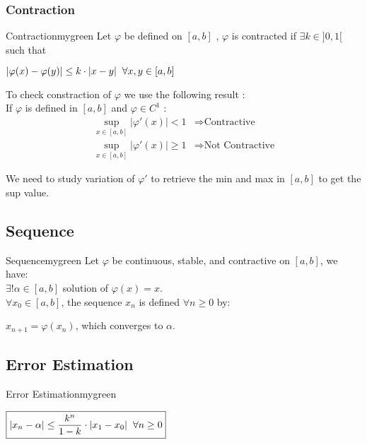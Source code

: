 \subsubsection{Contraction}
\begin{prettyBox}{Contraction}{mygreen}
Let \(\varphi\) be defined on \([a, b]\) , \(\varphi\) is contracted if 
\(\exists k \in ]0,1[\) such that

\begin{center}
 \(|\varphi(x) - \varphi(y)| \leq k\cdot|x-y| \hspace{0.2cm} \forall x,y 
\in[a,b]\)
\end{center}

\vspace{0.1cm}
To check constraction of \(\varphi\) we use the following result :\\[0.1cm]
If \(\varphi\) is defined in \([a,b]\) and \(\varphi \in C^{1} \) :
\begin{align*}
    \sup_{x \in [a, b]} |\varphi'(x)| < 1 &\Longrightarrow \text{Contractive}\\[0.1cm]
    \sup_{x \in [a, b]} |\varphi'(x)| \geq 1 &\Longrightarrow \text{Not Contractive}
\end{align*}
\vspace{0.1cm}

We need to study variation of \(\varphi'\) to retrieve
the min and max in \([a,b]\) to get the sup value.
\end{prettyBox}

\vspace{0.5cm}


\subsection{Sequence}
\begin{prettyBox}{Sequence}{mygreen}
    Let \(\varphi\) be continuous, stable, and contractive on \([a,b]\), we have:\\[0.15cm]
    \(\exists! \alpha \in [a,b]\) solution of \(\varphi(x) = x\).\\[0.1cm]
\(\forall x_0 \in [a,b]\), the sequence \(x_n\) is defined \(\forall n \geq 0\) by:

\begin{center}
  \(x_{n+1} = \varphi(x_n)\), which converges to \(\alpha\).
\end{center}
\end{prettyBox}

\subsection{Error Estimation}
\begin{prettyBox}{Error Estimation}{mygreen}
\begin{center}
    \(\boxed{|x_n - \alpha| \leq \dfrac{k^{n}}{1-k} \cdot |x_1-x_0| \hspace{0.2cm} \forall n\geq 0}\)
\end{center}
\end{prettyBox}

